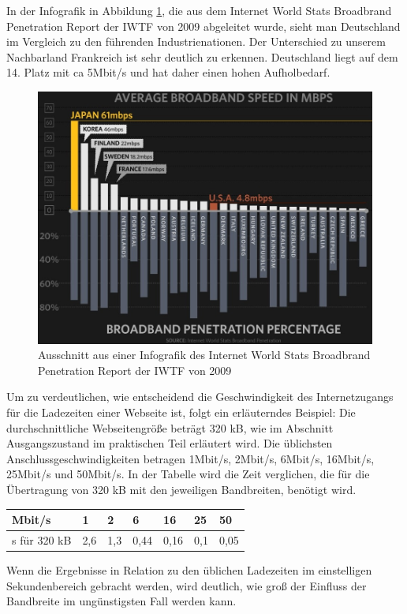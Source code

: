 In der Infografik in Abbildung \ref{fig:iwtfinfo}, die aus dem Internet World Stats Broadbrand Penetration Report der IWTF von 2009 abgeleitet wurde, sieht man Deutschland im Vergleich zu den führenden Industrienationen.\citep{Frucci2009} Der Unterschied zu unserem Nachbarland Frankreich ist sehr deutlich zu erkennen. Deutschland liegt auf dem 14. Platz mit ca 5Mbit/s und hat daher einen hohen Aufholbedarf.
\begin{figure}[!ht]
  \centering
  \includegraphics[scale=0.5]{material/worldinternetcomp.jpg}
  \caption{Ausschnitt aus einer Infografik des Internet World Stats Broadbrand Penetration Report der IWTF von 2009 }
  \label{fig:iwtfinfo}
\end{figure}
Um zu verdeutlichen, wie entscheidend die Geschwindigkeit des Internetzugangs für die Ladezeiten einer Webseite ist, folgt ein erläuterndes Beispiel:
Die durchschnittliche Webseitengröße beträgt 320 kB, wie im Abschnitt Ausgangszustand im praktischen Teil erläutert wird. Die üblichsten Anschlussgeschwindigkeiten betragen 1Mbit/s, 2Mbit/s, 6Mbit/s, 16Mbit/s, 25Mbit/s und 50Mbit/s. In der Tabelle wird die Zeit verglichen, die für die Übertragung von 320 kB mit den jeweiligen Bandbreiten, benötigt wird.
\begin{table}[!ht]
    \begin{tabular}{ l | l | l | l | l | l | l}
    \hline
    Mbit/s & 1 & 2 & 6 & 16 & 25 & 50 \\ \hline
    \hline
	s für 320 kB & 2,6 & 1,3 & 0,44 & 0,16 & 0,1 & 0,05 \\ \hline
    \end{tabular}
\end{table}
Wenn die Ergebnisse in Relation zu den üblichen Ladezeiten im einstelligen Sekundenbereich gebracht werden, wird deutlich, wie groß der Einfluss der Bandbreite im ungünstigsten Fall werden kann.
